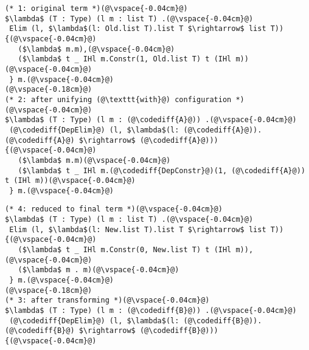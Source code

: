 \begin{figure*}
\begin{minipage}{0.49\textwidth}
\begin{lstlisting}
(* 1: original term *)(@\vspace{-0.04cm}@)
$\lambda$ (T : Type) (l m : list T) .(@\vspace{-0.04cm}@)
 Elim (l, $\lambda$(l: Old.list T).list T $\rightarrow$ list T)) {(@\vspace{-0.04cm}@)
   ($\lambda$ m.m),(@\vspace{-0.04cm}@)
   ($\lambda$ t _ IHl m.Constr(1, Old.list T) t (IHl m))(@\vspace{-0.04cm}@)
 } m.(@\vspace{-0.04cm}@)
(@\vspace{-0.18cm}@)
(* 2: after unifying (@\texttt{with}@) configuration *)(@\vspace{-0.04cm}@)
$\lambda$ (T : Type) (l m : (@\codediff{A}@)) .(@\vspace{-0.04cm}@)
 (@\codediff{DepElim}@) (l, $\lambda$(l: (@\codediff{A}@)).(@\codediff{A}@) $\rightarrow$ (@\codediff{A}@))) {(@\vspace{-0.04cm}@)
   ($\lambda$ m.m)(@\vspace{-0.04cm}@)
   ($\lambda$ t _ IHl m.(@\codediff{DepConstr}@)(1, (@\codediff{A}@)) t (IHl m))(@\vspace{-0.04cm}@)
 } m.(@\vspace{-0.04cm}@)
\end{lstlisting}
\end{minipage}
\hfill
\begin{minipage}{0.49\textwidth}
\begin{lstlisting}
(* 4: reduced to final term *)(@\vspace{-0.04cm}@)
$\lambda$ (T : Type) (l m : list T) .(@\vspace{-0.04cm}@)
 Elim (l, $\lambda$(l: New.list T).list T $\rightarrow$ list T)) {(@\vspace{-0.04cm}@)
   ($\lambda$ t _ IHl m.Constr(0, New.list T) t (IHl m)),(@\vspace{-0.04cm}@)
   ($\lambda$ m . m)(@\vspace{-0.04cm}@)
 } m.(@\vspace{-0.04cm}@)
(@\vspace{-0.18cm}@)
(* 3: after transforming *)(@\vspace{-0.04cm}@)
$\lambda$ (T : Type) (l m : (@\codediff{B}@)) .(@\vspace{-0.04cm}@)
 (@\codediff{DepElim}@) (l, $\lambda$(l: (@\codediff{B}@)).(@\codediff{B}@) $\rightarrow$ (@\codediff{B}@))) {(@\vspace{-0.04cm}@)

\end{lstlisting}
\end{minipage}
\end{figure*}
